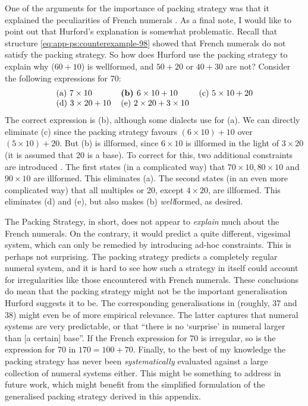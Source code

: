 \documentclass{../src/bcthesispart}
\begin{document}
One of the arguments for the importance of packing strategy was that it explained the peculiarities of French numerals \textcite{Hurford1975}.
As a final note, I would like to point out that Hurford’s explanation is somewhat problematic.
Recall that structure \eqref{eq:app-ps:counterexample-98} showed that French numerals do not satisfy the packing strategy. 
So how does Hurford use the packing strategy to explain why  ($60 + 10$) is wellformed, and $50+20$ or $40+30$ are not? 
Consider the following expressions for 70:
\begin{align*}
	\begin{tabular}{lll}
		(a) $7 \times 10$				
			& \textbf{(b) $6 \times 10 + 10$}
			& (c) $5 \times 10 + 20$\\
		(d) $3 \times 20 + 10$
			& (e) $2 \times 20 + 3 \times 10$
			&
	\end{tabular}
\end{align*}
The correct expression is (b), although some dialects use  for (a).
We can directly eliminate (c) since the packing strategy favours $(6 \times 10)+10$ over $(5\times 10)+20$.
But (b) is illformed, since  $6 \times 10$ is illformed in the light of $3 \times 20$ (it is assumed that 20 is a base).
To correct for this, two additional constraints are introduced \parencite[101]{Hurford1975}.
The first states (in a complicated way) that $70 \times 10, 80 \times 10$ and $90\times 10$ are illformed. This eliminates (a). 
The second states (in an even more complicated way) that all multiples or 20, except $4 \times 20$, are illformed. 
This eliminates (d) and (e), but also makes (b) \emph{well}formed, as desired.




The Packing Strategy, in short, does not appear to \emph{explain} much about the French numerals.
On the contrary, it would predict a quite different, vigesimal system, which can only be remedied by introducing ad-hoc constraints.
This is perhaps not surprising. 
The packing strategy predicts a completely regular numeral system, and it is hard to see how such a strategy in itself could account for irregularities like those encountered with French numerals.
These conclusions do mean that the packing strategy might not be the important generalisation Hurford suggests it to be.
The corresponding generalisations in \textcite{Greenberg1978} (roughly, 37 and 38) might even be of more empirical relevance.
The latter captures that numeral systems are very predictable, or that “there is no ‘surprise’ in numeral larger than [a certain] base”. 
If the French expression for 70 is irregular, so is the expression for 70 in $170 = 100+70$.
Finally, to the best of my knowledge the packing strategy has never been \emph{systematically} evaluated against a large collection of numeral systems either.
This might be something to address in future work, which might benefit from the simplified formulation of the generalised packing strategy derived in this appendix.
\end{document}
